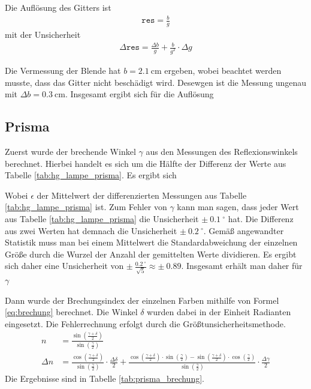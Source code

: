 \documentclass{article}
\begin{document}
Die Auflösung des Gitters ist
\begin{align*}
\texttt{res} = \frac{b}{g} 
\end{align*}
mit der Unsicherheit
\begin{align*}
\Delta\texttt{res} = \frac{\Delta b}{g} + \frac{b}{g^2}\cdot\Delta g
\end{align*}

Die Vermessung der Blende hat $b=2.1~$cm ergeben, wobei beachtet werden musste, dass das Gitter nicht beschädigt wird. Desewgen ist die Messung ungenau mit $\Delta b = 0.3~$cm.
Insgesamt ergibt sich für die Auflösung



\subsection{Prisma}

Zuerst wurde der brechende Winkel $\gamma$ aus den Messungen des Reflexionswinkels berechnet. Hierbei handelt es sich um die Hälfte der Differenz der Werte aus Tabelle \ref{tab:hg_lampe_prisma}. Es ergibt sich 

Wobei $\epsilon$ der Mittelwert der differenzierten Messungen aus Tabelle \ref{tab:hg_lampe_prisma} ist. Zum Fehler von $\gamma$ kann man sagen, dass jeder Wert aus Tabelle \ref{tab:hg_lampe_prisma} die Unsicherheit $\pm~0.1~^\circ$ hat. Die Differenz aus zwei Werten hat demnach die Unsicherheit $\pm~0.2~^\circ$. Gemäß angewandter Statistik muss man bei einem Mittelwert die Standardabweichung der einzelnen Größe durch die Wurzel der Anzahl der gemittelten Werte dividieren. Es ergibt sich daher eine Unsicherheit von $\pm~\frac{0.2~^\circ}{\sqrt{5}} \approx \pm~0.89$. Insgesamt erhält man daher für $\gamma$







Dann wurde der Brechungsindex der einzelnen Farben mithilfe von Formel \eqref{eq:brechung} berechnet. Die Winkel $\delta$ wurden dabei in der Einheit Radianten eingesetzt. Die Fehlerrechnung erfolgt durch die Größtunsicherheitsmethode.
\begin{align*}
n &= \frac{\sin\left(\frac{\gamma + \delta}{2}\right)}{\sin\left(\frac{\gamma}{2}\right)} \\
\Delta n &= \frac{\cos\left(\frac{\gamma + \delta}{2}\right)}{\sin\left(\frac{\gamma}{2}\right)}\cdot \frac{\Delta \delta}{2} + \frac{\cos\left(\frac{\gamma + \delta}{2}\right)\cdot \sin\left(\frac{\gamma}{2}\right) - \sin\left(\frac{\gamma + \delta}{2}\right)\cdot \cos\left(\frac{\gamma}{2}\right)}{\sin\left(\frac{\gamma}{2}\right)} \cdot\frac{\Delta \gamma}{2}
\end{align*}
Die Ergebnisse sind in Tabelle \ref{tab:prisma_brechung}.
\end{document}
